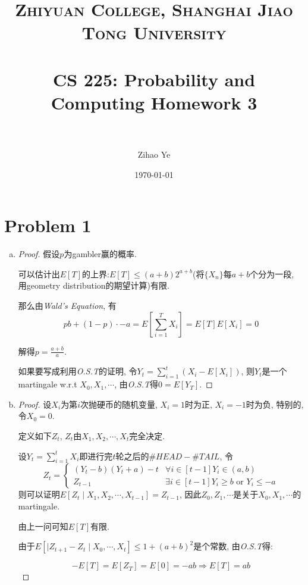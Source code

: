 \documentclass[paper=a4, fontsize=11pt]{scrartcl} %
\title{	
\normalfont \normalsize 
\textsc{Zhiyuan College, Shanghai Jiao Tong University} \\ %
\horrule{0.5pt} \\[0.4cm] %
\huge CS 225: Probability and Computing Homework 3 \\ %
\horrule{2pt} \\ %
}
\author{
\normalsize
	Zihao Ye
} %
\date{\normalsize\today} %
\numberwithin{figure}{section} %
\numberwithin{table}{section} %
\begin{document}
\maketitle %

\section*{Problem 1}
\begin{enumerate}[(a)]
	\item 
	\begin{proof}
	假设$p$为gambler赢的概率.

	可以估计出$E[T]$的上界:$E[T]\leq (a+b)2^{a+b}$(将$\{X_n\}$每$a+b$个分为一段, 用geometry distribution的期望计算)有限.

	那么由\textit{Wald's Equation}, 有
	$$pb + (1-p)\cdot-a = E\left[\sum_{i=1}^{T}X_i\right] = E[T]E[X_i] = 0 $$

	解得$p = \frac{a+b}{a}$.

	如果要写成利用\textit{O.S.T}的证明, 令$Y_t=\sum\limits_{i=1}^{t}\left(X_i - E[X_i]\right)$, 则$Y_t$是一个martingale w.r.t $X_0, X_1, \cdots$, 由\textit{O.S.T}得$0 = E[Y_T]$.
	\end{proof}
	\item
	\begin{proof}
	设$X_i$为第$i$次抛硬币的随机变量, $X_i = 1$时为正, $X_i = -1$时为负, 特别的, 令$X_0 = 0$.

	定义如下$Z_t$, $Z_{t}$由$X_1, X_2, \cdots, X_{t}$完全决定.

	设$Y_t = \sum\limits	_{i=1}^{t}X_i$即进行完$t$轮之后的$\#HEAD - \#TAIL$, 令
	$$Z_t = 
	\left\{\begin{array}{ll}
	(Y_t - b)(Y_t + a) - t 	& \forall i\in[t - 1] Y_{i} \in (a, b)\\
	Z_{t-1} 				& \exists i\in[t - 1] Y_{i} \geq b \textrm{ or } Y_{i} \leq -a 
	\end{array}\right.$$ 
	则可以证明$E[Z_t\mid X_1, X_2, \cdots, X_{t-1}] = Z_{t-1}$, 因此$Z_0, Z_1, \cdots$是关于$X_0, X_1, \cdots$的martingale.

	由上一问可知$E[T]$有限.

	由于$E[|Z_{t+1}-Z_{t}\mid X_0, \cdots, X_t]\leq 1 + (a+b)^2$是个常数, 由\textit{O.S.T}得:

	$$
 		-E[T] = E[Z_T] = E[0] = -ab \Longrightarrow E[T] = ab
 	$$
	\end{proof}

\end{enumerate}
\end{document}
